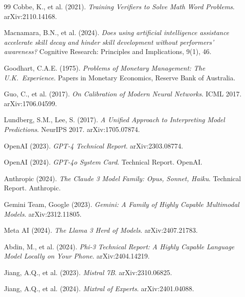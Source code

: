 \documentclass[12pt]{article}
\begin{document}
\begin{thebibliography}{99}
Cobbe, K., et al. (2021). \textit{Training Verifiers to Solve Math Word Problems}. arXiv:2110.14168.

Macnamara, B.N., et al. (2024). \textit{Does using artificial intelligence assistance accelerate skill decay and hinder skill development without performers' awareness?} Cognitive Research: Principles and Implications, 9(1), 46.

Goodhart, C.A.E. (1975). \textit{Problems of Monetary Management: The U.K.\ Experience}. Papers in Monetary Economics, Reserve Bank of Australia.

Guo, C., et al. (2017). \textit{On Calibration of Modern Neural Networks}. ICML 2017. arXiv:1706.04599.

Lundberg, S.M., Lee, S. (2017). \textit{A Unified Approach to Interpreting Model Predictions}. NeurIPS 2017. arXiv:1705.07874.

OpenAI (2023). \textit{GPT-4 Technical Report}. arXiv:2303.08774.

OpenAI (2024). \textit{GPT-4o System Card}. Technical Report. OpenAI.

Anthropic (2024). \textit{The Claude 3 Model Family: Opus, Sonnet, Haiku}. Technical Report. Anthropic.

Gemini Team, Google (2023). \textit{Gemini: A Family of Highly Capable Multimodal Models}. arXiv:2312.11805.

Meta AI (2024). \textit{The Llama 3 Herd of Models}. arXiv:2407.21783.

Abdin, M., et al. (2024). \textit{Phi-3 Technical Report: A Highly Capable Language Model Locally on Your Phone}. arXiv:2404.14219.

Jiang, A.Q., et al. (2023). \textit{Mistral 7B}. arXiv:2310.06825.

Jiang, A.Q., et al. (2024). \textit{Mixtral of Experts}. arXiv:2401.04088.

\end{thebibliography}
\end{document}
